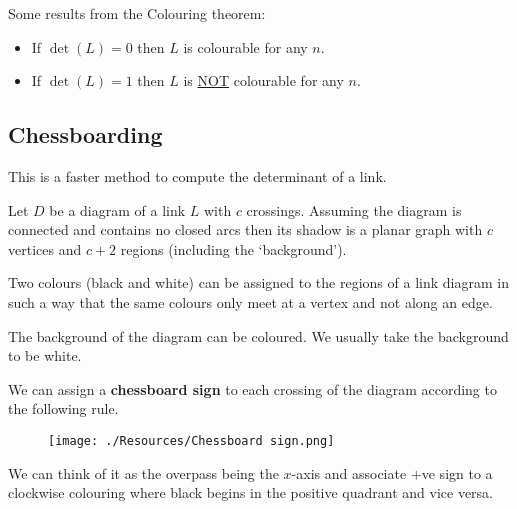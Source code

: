 \documentclass[12pt, a4paper]{article}
\begin{document}
\begin{corollary}
    Some results from the Colouring theorem:
    \begin{itemize}
        \item If \(\det(L)=0\) then \(L\) is colourable for any \(n\).
        \item If \(\det(L)=1\) then \(L\) is \underline{NOT} colourable for any \(n\).
    \end{itemize}
\end{corollary}

\subsection{Chessboarding}

This is a faster method to compute the determinant of a link. 

\begin{proposition}
    Let \(D\) be a diagram of a link \(L\) with \(c\) crossings. Assuming the diagram is connected and contains no closed arcs then its shadow is a planar graph with \(c\) vertices and \(c+2\) regions (including the `background').
\end{proposition}

\begin{mdthm}[Chessboarding]
    Two colours (black and white) can be assigned to the regions of a link diagram in such a way that the same colours only meet at a vertex and not along an edge.
\end{mdthm}

\begin{mdnote}
    The background of the diagram can be coloured. We usually take the background to be white.
\end{mdnote}

\begin{definition}
    We can assign a \textbf{chessboard sign} to each crossing of the diagram according to the following rule.
    \begin{figure}[H]
        \begin{center}
            \texttt{[image: ./Resources/Chessboard sign.png]}
        \end{center}
    \end{figure}
    We can think of it as the overpass being the \(x\)-axis and associate \(+\)ve sign to a clockwise colouring where black begins in the positive quadrant and vice versa.
\end{definition}
\end{document}

